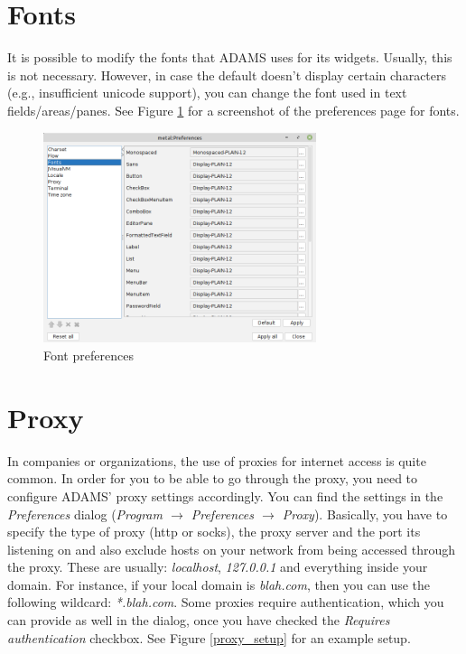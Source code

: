 \section{Fonts}
It is possible to modify the fonts that ADAMS uses for its widgets. Usually,
this is not necessary. However, in case the default doesn't display certain
characters (e.g., insufficient unicode support), you can change the font
used in text fields/areas/panes. See Figure \ref{fonts_setup} for a screenshot
of the preferences page for fonts.

\begin{figure}[htb]
  \centering
  \includegraphics[width=8.0cm]{images/fonts_setup.png}
  \caption{Font preferences}
  \label{fonts_setup}
\end{figure}

\section{Proxy}
In companies or organizations, the use of proxies for internet access is quite
common. In order for you to be able to go through the proxy, you need to 
configure ADAMS' proxy settings accordingly. You can find the settings in the
\textit{Preferences} dialog (\textit{Program $\rightarrow$ Preferences $\rightarrow$ Proxy}).
Basically, you have to specify the type of proxy (http or socks), the proxy server 
and the port its listening on and also exclude hosts on your network from being 
accessed through the proxy. These are usually: \textit{localhost}, \textit{127.0.0.1} 
and everything inside your domain. For instance, if your local domain is 
\textit{blah.com}, then you can use the following wildcard: \textit{*.blah.com}. 
Some proxies require authentication, which you can provide as well in the dialog,
once you have checked the \textit{Requires authentication} checkbox.
See Figure \ref{proxy_setup} for an example setup.

